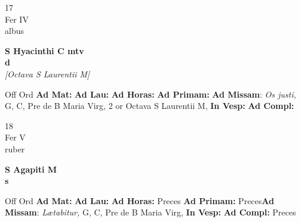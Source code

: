 \documentclass[10pt, openany]{book}
\begin{document}
    \begin{center}
        \begin{minipage}{3.5in}
            \vspace{2em}
            \begin{minipage}{0.5in}
                {\Huge 17} \\
                {\normalsize Fer IV} \\
                {\normalsize albus}
            \end{minipage}
            \begin{minipage}{3.0in}
                \textbf{ \large S Hyacinthi C mtv \\
                \textnormal{\normalsize d}} \\ \textit{[Octava S Laurentii M]} \\ 
            \end{minipage}
            \begin{justify}Off Ord
                \textbf{Ad Mat: }
                \textbf{Ad Lau: }
                \textbf{Ad Horas: }
                \textbf{Ad Primam: }\textbf{Ad Missam}: \textit{Os justi,} G, C, Pre de B Maria Virg, 2 or Octava S Laurentii M,  
                \textbf{In Vesp: }
                \textbf{Ad Compl: }
            \end{justify}
        \end{minipage}
    \end{center}

    \begin{center}
        \begin{minipage}{3.5in}
            \vspace{2em}
            \begin{minipage}{0.5in}
                {\Huge 18} \\
                {\normalsize Fer V} \\
                {\normalsize ruber}
            \end{minipage}
            \begin{minipage}{3.0in}
                \textbf{ \large S Agapiti M \\
                \textnormal{\normalsize s}} \\ 
            \end{minipage}
            \begin{justify}Off Ord
                \textbf{Ad Mat: }
                \textbf{Ad Lau: }
                \textbf{Ad Horas: }Preces
                \textbf{Ad Primam: }Preces\textbf{Ad Missam}: \textit{Lætabitur,} G, C, Pre de B Maria Virg,  
                \textbf{In Vesp: }
                \textbf{Ad Compl: }Preces
            \end{justify}
        \end{minipage}
    \end{center}
\end{document}
